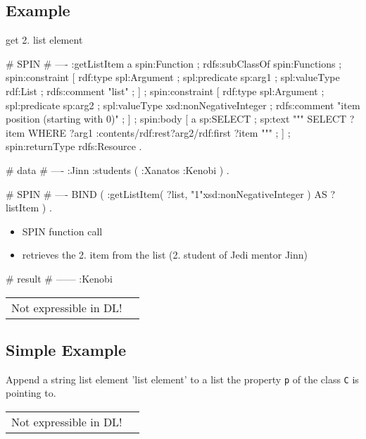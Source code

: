 \documentclass{llncs}
\newcommand{\ms}[1]{\texttt{#1}}
\newenvironment{DL}{
  \vspace{0cm}
	\begin{center}
  \begin{tabular}{r l}

}{
  \end{tabular}
	\end{center}
}
\begin{document}
\subsection{Example}

get 2. list element

\begin{ex}
# SPIN
# ----
:getListItem
    a spin:Function ; rdfs:subClassOf spin:Functions ;
    spin:constraint [
        rdf:type spl:Argument ;
        spl:predicate sp:arg1 ;
        spl:valueType rdf:List ;
        rdfs:comment "list" ; ] ;
    spin:constraint [
        rdf:type spl:Argument ;
        spl:predicate sp:arg2 ;
        spl:valueType xsd:nonNegativeInteger ;
        rdfs:comment "item position (starting with 0)" ; ] ;
    spin:body [
        a sp:SELECT ;
        sp:text """
            SELECT ?item
            WHERE {
                ?arg1 :contents/rdf:rest{?arg2}/rdf:first ?item } """ ; ] ;
    spin:returnType rdfs:Resource .
\end{ex}

\begin{ex}
# data
# ----
:Jinn :students 
     ( :Xanatos :Kenobi ) . 
\end{ex}

\begin{ex}
# SPIN
# ----
BIND ( :getListItem( ?list, "1"xsd:nonNegativeInteger ) AS ?listItem ) .
\end{ex}

\begin{itemize}
  \item SPIN function call
	\item retrieves the 2. item from the list (2. student of Jedi mentor Jinn)
\end{itemize}

\begin{ex}
# result
# ------
:Kenobi
\end{ex}

\begin{DL}
Not expressible in DL!
\end{DL}

\subsection{Simple Example}

Append a string list element 'list element' to a list the property \ms{p} of the class \ms{C} is pointing to.

\begin{DL}
Not expressible in DL!
\end{DL}
\end{document}
